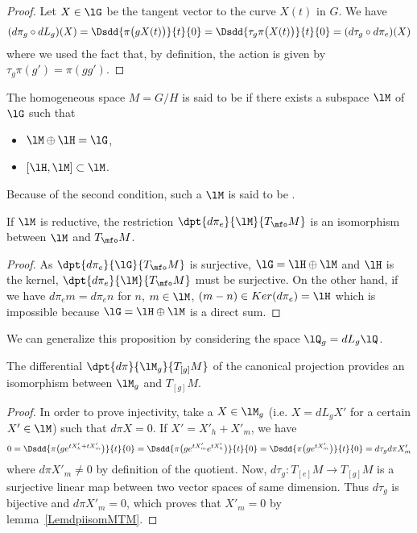 \begin{proof}
	Let $X\in \lG$ be the tangent vector to the curve $X(t)$ in $G$. We have
	\begin{equation}
		(d\pi_g\circ dL_g)(X)=\Dsdd{ \pi\big( gX(t) \big) }{t}{0}=\Dsdd{ \tau_g\pi\big( X(t) \big) }{t}{0}=(d\tau_g\circ d\pi_e)(X)
	\end{equation}
	where we used the fact that, by definition, the action is given by $\tau_g\pi(g')=\pi(gg')$.
\end{proof}

\begin{definition}
	The homogeneous space $M=G/H$ is said to be  if there exists a subspace $\lM$ of $\lG$ such that
		\begin{itemize}
		\item $\lM\oplus\lH=\lG$,
		\item $[\lH,\lM]\subset\lM$.
	\end{itemize}
\end{definition}
Because of the second condition, such a $\lM$ is said to be .

\begin{lemma}		\label{LemdpiisomMTM}
If $\lM$ is reductive, the restriction $\dpt{d\pi_e}{\lM}{T_{\mfo}M}$ is an isomorphism between $\lM$ and $T_{\mfo}M$.
\end{lemma}
\begin{proof}
As $\dpt{d\pi_e}{\lG}{T_{\mfo}M}$ is surjective, $\lG=\lH\oplus\lM$ and $\lH$ is the kernel, $\dpt{d\pi_e}{\lM}{T_{\mfo}M}$ must be surjective. On the other hand, if we have $d\pi_em=d\pi_en$ for $n$, $m\in\lM$, $(m-n)\in Ker(d\pi_e)=\lH$ which is impossible because $\lG=\lH\oplus\lM$ is a direct sum.
\end{proof}

We can generalize this proposition by considering the space $\lQ_g=dL_g\lQ$.
\begin{proposition} 		\label{PropDiffPiBijTgGH}\label{Cordpiietwii}
The differential $\dpt{d\pi}{\lM_g}{T_{[g]}M}$ of the canonical projection provides an isomorphism between $\lM_g$ and $T_{[g]}M$.
\end{proposition}

\begin{proof}
In order to prove injectivity, take a $X\in \lM_g$ (i.e. $X=dL_gX'$ for a certain $X'\in\lM$) such that $d\pi X=0$. If $X'=X'_h+X'_m$, we have
\[
0=\Dsdd{ \pi\big( g e^{tX'_h+tX'_m} \big) }{t}{0}
		=\Dsdd{ \pi\big( g e^{tX'_m} e^{tX'_h} \big) }{t}{0}
		=\Dsdd{ \pi\big( g e^{tX'_m} \big) }{t}{0}
		=d\tau_g d\pi X'_m
\]
where $d\pi X'_m\neq 0$ by definition of the quotient. Now, $d\tau_g\colon T_{[e]}M\to T_{[g]}M$ is a surjective linear map between two vector spaces of same dimension. Thus $d\tau_g$ is bijective and $d\pi X'_m=0$, which proves that $X'_m=0$ by lemma~\ref{LemdpiisomMTM}.
\end{proof}

